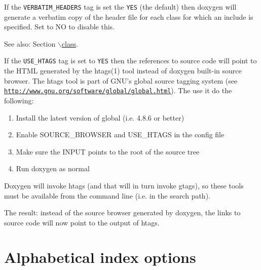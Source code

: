 \begin{description}
\label{config_cfg_verbatim_headers}
\hypertarget{config_cfg_verbatim_headers}{}
 \item[{\tt VERBATIM\_\-HEADERS} ] If the {\tt VERBATIM\_\-HEADERS} tag is set the {\tt YES} (the default) then doxygen will generate a verbatim copy of the header file for each class for which an include is specified. Set to NO to disable this. \begin{Desc}
\item[See also:]Section \hyperlink{commands_cmdclass}{$\backslash$class}.\end{Desc}
\label{config_cfg_use_htags}
\hypertarget{config_cfg_use_htags}{}
 \item[{\tt USE\_\-HTAGS} ] If the {\tt USE\_\-HTAGS} tag is set to {\tt YES} then the references to source code will point to the HTML generated by the htags(1) tool instead of doxygen built-in source browser. The htags tool is part of GNU's global source tagging system (see \href{http://www.gnu.org/software/global/global.html}{\tt http://www.gnu.org/software/global/global.html}). The use it do the following:

\begin{enumerate}
\item Install the latest version of global (i.e. 4.8.6 or better)\item Enable SOURCE\_\-BROWSER and USE\_\-HTAGS in the config file\item Make sure the INPUT points to the root of the source tree\item Run doxygen as normal\end{enumerate}


Doxygen will invoke htags (and that will in turn invoke gtags), so these tools must be available from the command line (i.e. in the search path).

The result: instead of the source browser generated by doxygen, the links to source code will now point to the output of htags.

\end{description}
\hypertarget{config_alphabetical_index}{}\section{Alphabetical index options}\label{config_alphabetical_index}
\label{config_cfg_alphabetical_index}
\hypertarget{config_cfg_alphabetical_index}{}
